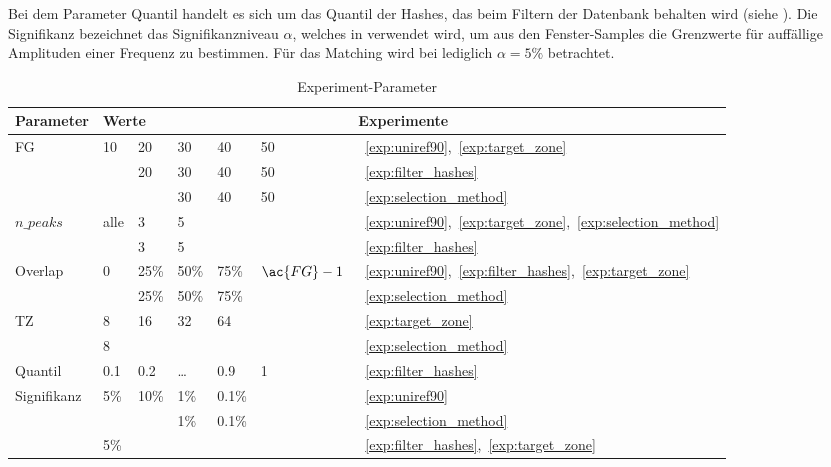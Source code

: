         \begin{table}[H]
            \centering
            \caption{Experiment-Parameter}
            \label{tab:parameter}
            \begin{minipage}{\textwidth}
                Bei dem Parameter Quantil handelt es sich um das Quantil der Hashes, das beim Filtern der Datenbank behalten wird (siehe ). Die Signifikanz bezeichnet das Signifikanzniveau $\alpha$, welches in  verwendet wird, um aus den Fenster-Samples die Grenzwerte für auffällige Amplituden einer Frequenz zu bestimmen. Für das Matching wird bei  lediglich $\alpha=5\%$ betrachtet.
            \end{minipage}
            \begin{tabular}{lllllll}
            \toprule
             \textbf{Parameter} & \multicolumn{5}{l}{\textbf{Werte}} & \textbf{Experimente}\\
             \midrule
             \acf{FG}    & 10 & 20    & 30     & 40     & 50        &~\ref{exp:uniref90},~\ref{exp:target_zone}\\
                         &    & 20    & 30     & 40     & 50        &~\ref{exp:filter_hashes}\\
                         &    &       & 30     & 40     & 50        &~\ref{exp:selection_method}\\
             $n\_peaks$  &alle& 3     & 5      &        &           &~\ref{exp:uniref90},~\ref{exp:target_zone},~\ref{exp:selection_method}\\
                         &    & 3     & 5      &        &           &~\ref{exp:filter_hashes}\\
             Overlap     & 0  & 25\%  & 50\%   & 75\%   &$\ac{FG}-1$&~\ref{exp:uniref90},~\ref{exp:filter_hashes},~\ref{exp:target_zone}\\
                         &    & 25\%  & 50\%   & 75\%   &           &~\ref{exp:selection_method}\\
             \acl{TZ}    & 8  & 16    & 32     & 64     &           &~\ref{exp:target_zone}\\
                         & 8  &       &        &        &           &~\ref{exp:selection_method}\\
             Quantil     &0.1 & 0.2   & \dots  & 0.9    &     1     &~\ref{exp:filter_hashes}\\
             Signifikanz &5\% & 10\%  &   1\%  & 0.1\%  &           &~\ref{exp:uniref90}\\
                         &    &       &   1\%  & 0.1\%  &           &~\ref{exp:selection_method}\\
                         &5\% &       &        &        &           &~\ref{exp:filter_hashes},~\ref{exp:target_zone}\\
             \bottomrule
            \end{tabular}
        \end{table}
